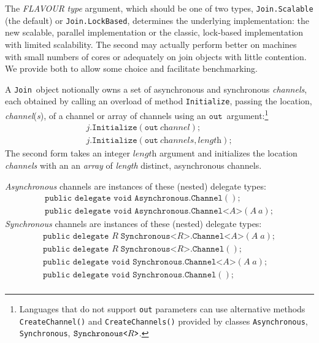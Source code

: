 \documentclass{article}
\newcommand{\cjoin}{{\texttt{Join}}}
\newcommand{\dasync}{{\texttt{Asynchronous.Channel}}}
\newcommand{\dasyncA}[1]{{\texttt{Asynchronous.Channel<}#1\texttt{>}}}
\newcommand{\dsyncvoidA}[1]{{\texttt{Synchronous.Channel<}#1\texttt{>}}}
\newcommand{\dsyncvoid}{{\texttt{Synchronous.Channel}}}
\newcommand{\dsyncR}[1]{{\texttt{Synchronous<}#1\texttt{>.Channel}}}
\newcommand{\dsyncRA}[2]{{\texttt{Synchronous<}#1\texttt{>.Channel<}#2\texttt{>}}}
\newcommand{\dotinitialize}{\texttt{.Initialize}}
\newcommand{\Initialize}{\texttt{Initialize}}
\newcommand{\joinobj}{\ensuremath{j}}
\newcommand{\tvara}{\ensuremath{A}}
\newcommand{\tvarr}{\ensuremath{R}}
\newcommand{\out}{\ensuremath{\texttt{out}}}
\begin{document}
The \textit{FLAVOUR} \emph{type} argument, which should be one of two types, \texttt{Join.Scalable} (the default) or \texttt{Join.LockBased},
determines the underlying implementation: the new scalable, parallel implementation or the classic, lock-based implementation with limited scalability. The second may actually perform
better on machines with small numbers of cores or adequately on join objects with little contention. We provide both to allow some choice and facilitate benchmarking.

A \cjoin\ object notionally owns a set of asynchronous and synchronous \emph{channels}, each obtained by calling an overload of
method \Initialize, passing the location, \textit{channel}(\textit{s}), of a channel or array of channels using an \out\ argument:\footnote{Languages that do not support \texttt{out} parameters can use alternative methods
\texttt{CreateChannel()} and \texttt{CreateChannels()} provided by classes \texttt{Asynchronous}, \texttt{Synchronous},
 $\texttt{Synchronous<\tvarr>}$.}
\[ 
\begin{array}{l}
  \joinobj\dotinitialize(\out\ \textit{channel});\\
  \joinobj\dotinitialize(\out\ \textit{channels}, \textit{length}); 
\end{array}
\]
\noindent The second form takes an integer $\textit{length}$ argument and initializes the location \textit{channels} with an 
an \emph{array} of \textit{length} distinct, asynchronous channels.


\emph{Asynchronous} channels are instances of these (nested) delegate types: %
\[ 
\begin{array}{l}
  \texttt{public delegate void } \dasync();\\
  \texttt{public delegate void } \dasyncA{\tvara}(\tvara\ a);
\end{array}
\]
\emph{Synchronous} channels are instances of  these (nested) delegate types: %
\[ 
\begin{array}{l}
  \texttt{public delegate } \tvarr\; \dsyncRA{\tvarr}{\tvara}(\tvara\;a);\\
  \texttt{public delegate } \tvarr\; \dsyncR{\tvarr}();\\
  \texttt{public delegate void } \dsyncvoidA{\tvara}(\tvara\;a);\\
  \texttt{public delegate void } \dsyncvoid();\\
\end{array}
\]
\end{document}
